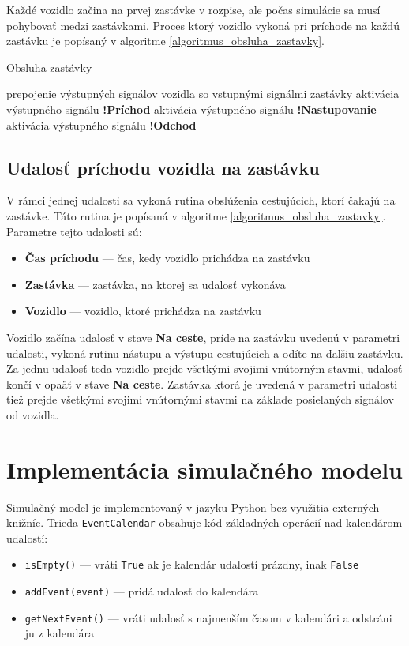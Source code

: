 Každé vozidlo začina na prvej zastávke v rozpise, ale počas simulácie sa musí pohybovať medzi zastávkami.
Proces ktorý vozidlo vykoná pri príchode na každú zastávku je popísaný v algoritme \ref{algoritmus_obsluha_zastavky}.

\vspace*{\dimexpr 0.5\baselineskip\relax}
\begin{algorithm}[H]
\label{algoritmus_obsluha_zastavky}
\caption{Obsluha zastávky}
  prepojenie výstupných signálov vozidla so vstupnými signálmi zastávky\;
  aktivácia výstupného signálu \textbf{!Príchod}\;
  aktivácia výstupného signálu \textbf{!Nastupovanie}\;
  aktivácia výstupného signálu \textbf{!Odchod}\;
\end{algorithm}

\subsection*{Udalosť príchodu vozidla na zastávku}

V rámci jednej udalosti sa vykoná rutina obslúženia cestujúcich, ktorí čakajú na zastávke. Táto rutina je popísaná v algoritme \ref{algoritmus_obsluha_zastavky}.
Parametre tejto udalosti sú:
\begin{itemize}
  \item \textbf{Čas príchodu} --- čas, kedy vozidlo prichádza na zastávku
  \item \textbf{Zastávka} --- zastávka, na ktorej sa udalosť vykonáva
  \item \textbf{Vozidlo} --- vozidlo, ktoré prichádza na zastávku
\end{itemize}

Vozidlo začína udalosť v stave \textbf{Na ceste}, príde na zastávku uvedenú v parametri udalosti, vykoná rutinu nástupu a výstupu cestujúcich a odíte na ďalšiu zastávku.
Za jednu udalosť teda vozidlo prejde všetkými svojimi vnútorným stavmi, udalosť končí v opaäť v stave \textbf{Na ceste}.
Zastávka ktorá je uvedená v parametri udalosti tiež prejde všetkými svojimi vnútornými stavmi na základe posielaných signálov od vozidla.

\section{Implementácia simulačného modelu}

Simulačný model je implementovaný v jazyku Python bez využitia externých knižníc.
Trieda \texttt{EventCalendar} obsahuje kód základných operácií nad kalendárom udalostí:
\begin{itemize}
  \item \texttt{isEmpty()} --- vráti \texttt{True} ak je kalendár udalostí prázdny, inak \texttt{False}
  \item \texttt{addEvent(event)} --- pridá udalosť do kalendára
  \item \texttt{getNextEvent()} --- vráti udalosť s najmenším časom v kalendári a odstráni ju z kalendára
\end{itemize}

